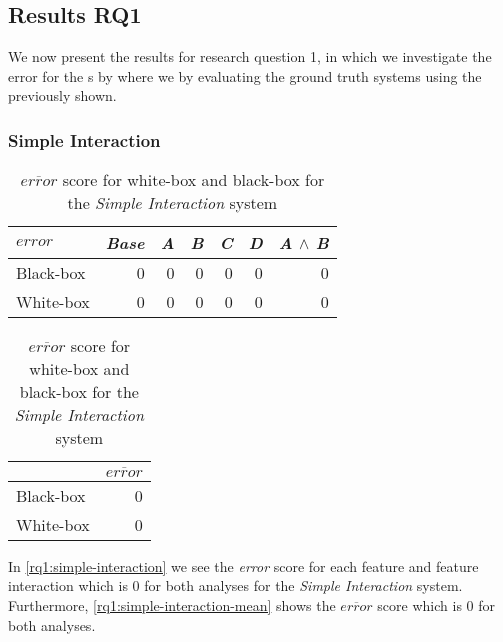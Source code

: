 \subsection*{Results RQ1}

We now present the results for research question 1, in which we investigate the error for the {\perfInfluenceModel}s by
 where we by evaluating the ground truth systems using the {\perfInfluenceModel} previously
shown.

\subsubsection*{Simple Interaction}

\begin{table}[H]
\begin{minipage}{.5\linewidth}
    \centering
    \begin{tabular}{lrrrrrr}    \toprule
    $error$     & \emph{Base} & \emph{A} & \emph{B} & \emph{C} & \emph{D} & \emph{A} $\land$ \emph{B}   \\ \midrule
    Black-box & 0 & 0 & 0 & 0 & 0 & 0      \\
    White-box & 0 & 0 & 0 & 0 & 0 & 0      \\ \bottomrule
    \end{tabular}
    \caption{Respective \emph{error} scores for white-box and black-box {\perfInfluenceModel}s for the \emph{Simple Interaction} system.}
    \label{rq1:simple-interaction}
\end{minipage}%
\hspace{7mm}
\begin{minipage}{.37\linewidth}
    \centering
    \begin{tabular}{lr}
        \toprule
                  & $\overline{error}$   \\ \midrule
        Black-box & 0              \\
        White-box & 0              \\ \bottomrule
        \end{tabular}  
        \caption{$\overline{error}$ score for white-box and black-box for the \emph{Simple Interaction} system}
        \label{rq1:simple-interaction-mean}
    \end{minipage}
\end{table}

In \autoref{rq1:simple-interaction} we see the \emph{error} score for each 
feature and feature interaction which is $0$ for both analyses for the \emph{Simple Interaction} system. 
Furthermore, \autoref{rq1:simple-interaction-mean} shows the $\overline{error}$ score which is $0$ for both analyses.

